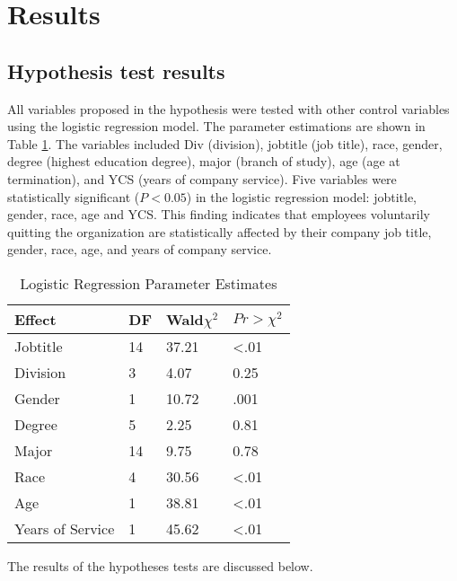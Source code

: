 \section{Results}
\subsection{Hypothesis test results}

All variables proposed in the hypothesis were tested with other control variables using the logistic regression model. The parameter estimations are shown in Table \ref{tab:logitpar}. The variables included Div (division), jobtitle (job title), race, gender, degree (highest education degree), major (branch of study), age (age at termination), and YCS (years of company service). Five variables were statistically significant ($P<0.05$) in the logistic regression model: jobtitle, gender, race, age and YCS. This finding indicates that employees voluntarily quitting the organization are statistically affected by their company job title, gender, race, age, and years of company service.

\begin{table}[http]
	\centering
	\caption{Logistic Regression Parameter Estimates}
	\label{tab:logitpar}
	\begin{tabular}{llll}
		\toprule
		Effect           & DF & Wald$\chi^2$ & $Pr>\chi^2 $ \\
		\midrule
		Jobtitle         & 14 & 37.21                    & \textless.01                     \\
		Division         & 3  & 4.07                     & 0.25                               \\
		Gender           & 1  & 10.72                    &  .001                              \\
		Degree           & 5  & 2.25                     & 0.81                               \\
		Major            & 14 & 9.75                     & 0.78                               \\
		Race             & 4  & 30.56                    & \textless.01                      \\
		Age              & 1  & 38.81                    & \textless.01                      \\
		Years of Service & 1  & 45.62                    & \textless.01     \\
		\bottomrule                
	\end{tabular}
\end{table}
The results of the hypotheses tests are discussed below.

